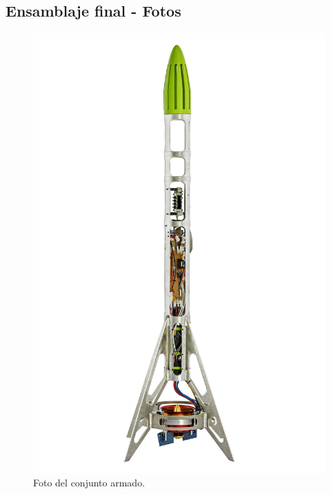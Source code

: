 \subsection{Ensamblaje final - Fotos}
\begin{figure}[htb]
    \centering
    \includegraphics[height=0.6\pdfpageheight]{fig/hq/wide_plane_bonete.jpg}
    \caption{Foto del conjunto armado.}
    \label{fig:hq/wide_plane_bonete}
\end{figure}

